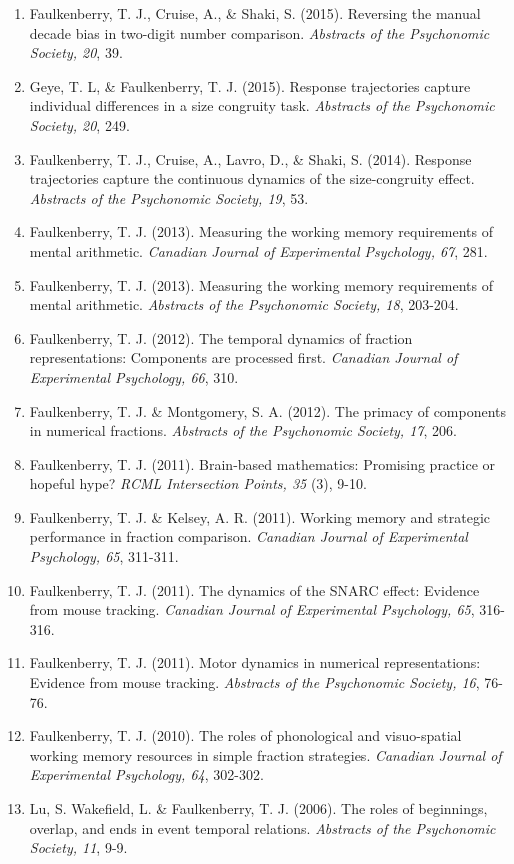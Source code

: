 \documentclass[article,10pt]{article}
\begin{document}
\begin{enumerate}
\item Faulkenberry, T. J., Cruise, A., \& Shaki, S. (2015). Reversing the manual decade bias in two-digit number comparison. \emph{Abstracts of the Psychonomic Society, 20}, 39.
\item Geye, T. L, \& Faulkenberry, T. J. (2015). Response trajectories capture individual differences in a size congruity task. \emph{Abstracts of the Psychonomic Society, 20}, 249.
\item Faulkenberry, T. J., Cruise, A., Lavro, D., \& Shaki, S. (2014). Response trajectories capture the continuous dynamics of the size-congruity effect. \emph{Abstracts of the Psychonomic Society, 19}, 53.
\item Faulkenberry, T. J. (2013). Measuring the working memory requirements of mental arithmetic. \emph{Canadian Journal of Experimental Psychology, 67}, 281.
\item Faulkenberry, T. J. (2013). Measuring the working memory requirements of mental arithmetic. \emph{Abstracts of the Psychonomic Society, 18}, 203-204.
\item Faulkenberry, T. J. (2012). The temporal dynamics of fraction representations: Components are processed first. \emph{Canadian Journal of Experimental Psychology, 66}, 310.
\item Faulkenberry, T. J. \& Montgomery, S. A. (2012). The primacy of components in numerical fractions. \emph{Abstracts of the Psychonomic Society, 17}, 206.
\item Faulkenberry, T. J. (2011). Brain-based mathematics: Promising practice or hopeful hype? \emph{RCML Intersection Points, 35} (3), 9-10.
\item Faulkenberry, T. J. \& Kelsey, A. R. (2011). Working memory and strategic performance in fraction comparison. \emph{Canadian Journal of Experimental Psychology, 65}, 311-311.
\item Faulkenberry, T. J. (2011). The dynamics of the SNARC effect: Evidence from mouse tracking. \emph{Canadian Journal of Experimental Psychology, 65}, 316-316.
\item Faulkenberry, T. J. (2011). Motor dynamics in numerical representations: Evidence from mouse tracking. \emph{Abstracts of the Psychonomic Society, 16}, 76-76.
\item Faulkenberry, T. J. (2010). The roles of phonological and visuo-spatial working memory resources in simple fraction strategies. \emph{Canadian Journal of Experimental Psychology, 64}, 302-302.
\item Lu, S. Wakefield, L. \& Faulkenberry, T. J. (2006). The roles of beginnings, overlap, and ends in event temporal relations. \emph{Abstracts of the Psychonomic Society, 11}, 9-9.
\end{enumerate}
\end{document}

